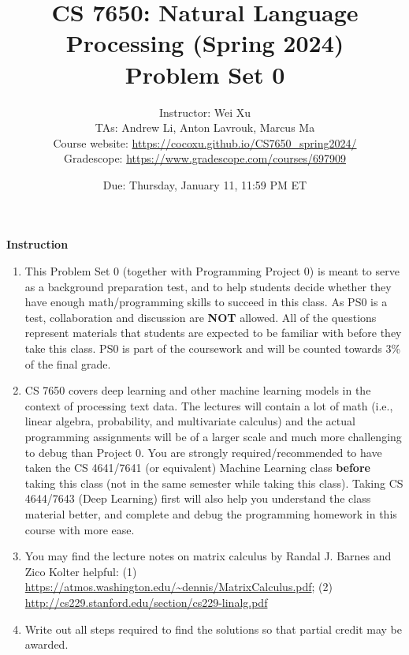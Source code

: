 \documentclass[11pt, letterpaper]{article}
\begin{document}
\title{CS 7650: Natural Language Processing (Spring 2024) \\ Problem Set 0}
\author{Instructor: Wei Xu \\ TAs: Andrew Li, Anton Lavrouk, Marcus Ma
\\Course website: \url{https://cocoxu.github.io/CS7650_spring2024/}
\\Gradescope: \url{https://www.gradescope.com/courses/697909}}
\date{Due: Thursday, January 11, 11:59 PM ET}
\maketitle

{\Large \textbf{Instruction}}
\begin{enumerate}
    \item This Problem Set 0 (together with Programming Project 0) is meant to serve as a background preparation test, and to help students decide whether they have enough math/programming skills to succeed in this class. As PS0 is a test, collaboration and discussion are \textbf{NOT} allowed. All of the questions represent materials that students are expected to be familiar with before they take this class. PS0 is part of the coursework and will be counted towards 3\%  of the final grade. 
    
    \item CS 7650 covers deep learning and other machine learning models in the context of processing text data. The lectures will contain a lot of math (i.e., linear algebra, probability, and multivariate calculus) and the actual programming assignments will be of a larger scale and much more challenging to debug than Project 0. You are strongly required/recommended to have taken the CS 4641/7641 (or equivalent) Machine Learning  class \textbf{before} taking this class (not in the same semester while taking this class). Taking CS 4644/7643 (Deep Learning) first will also help you understand the class material better, and complete and debug the programming homework in this course with more ease.
   
    \item You may find the lecture notes on matrix calculus by Randal J. Barnes and Zico Kolter helpful: (1) \url{https://atmos.washington.edu/~dennis/MatrixCalculus.pdf}; (2)
    \url{http://cs229.stanford.edu/section/cs229-linalg.pdf}
        
    \item Write out all steps required to find the solutions so that partial credit may be awarded.


\end{enumerate}
\end{document}
